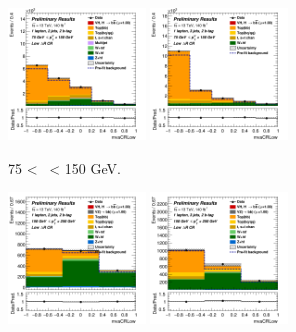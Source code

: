 \begin{figure}[h!]
    \centering
    \begin{subfigure}[b]{\textwidth}
        \centering
        \includegraphics[width=0.40\textwidth]{Images/VH/Own_fit/postfit_VHbb/Region_distmvaCRLow_BMax150_BMin75_DCRLow_J2_TTypebb_T2_L1_Y6051_GlobalFit_conditionnal_mu1.png}
        \includegraphics[width=0.40\textwidth]{Images/VH/Own_fit/postfit_VHbb/Region_distmvaCRLow_BMax150_BMin75_DCRLow_J3_TTypebb_T2_L1_Y6051_GlobalFit_conditionnal_mu1.png}
        \caption{75 < \ptv\ < 150 GeV.}
        \label{fig:plots_VHbb_1L_75_CRL}
    \end{subfigure}
    \begin{subfigure}[b]{\textwidth}
        \centering
        \includegraphics[width=0.40\textwidth]{Images/VH/Own_fit/postfit_VHbb/Region_distmvaCRLow_BMax250_BMin150_DCRLow_J2_TTypebb_T2_L1_Y6051_GlobalFit_conditionnal_mu1.png}
        \includegraphics[width=0.40\textwidth]{Images/VH/Own_fit/postfit_VHbb/Region_distmvaCRLow_BMax250_BMin150_DCRLow_J3_TTypebb_T2_L1_Y6051_GlobalFit_conditionnal_mu1.png}

\end{subfigure}
\end{figure}

